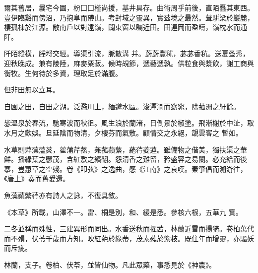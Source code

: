 \begin{pinyinscope}
爾其舊居，曩宅今園，枌囗囗槿尚援，基井具存。曲術周乎前後，直陌矗其東西。豈伊臨谿而傍沼，乃抱阜而帶山。考封域之靈異，實茲境之最然。葺駢梁於巖麓，棲孤棟於江源。敞南戶以對遠嶺，闢東窗以矚近田。田連岡而盈疇，嶺枕水而通阡。


阡陌縱橫，塍埒交經。導渠引流，脈散溝
 并。蔚蔚豐秫，苾苾香秔。送夏蚤秀，迎秋晚成。兼有陵陸，麻麥粟菽。候時覘節，遞藝遞孰。供粒食與漿飲，謝工商與衡牧。生何待於多資，理取足於滿腹。



 但非田無以立耳。



 自園之田，自田之湖。泛濫川上，緬邈水區。浚潭澗而窈窕，除菰洲之紆餘。


毖溫泉於春流，馳寒波而秋徂。風生浪於蘭渚，日倒景於椒塗。飛漸榭於中沚，取水月之歡娛。旦延陰而物清，夕棲芬而氣敷。顧情交之永絕，覬雲客之
 暫如。


水草則萍藻蕰菼，雚蒲芹蓀，蒹菰蘋蘩，蕝荇菱蓮。雖備物之偕美，獨扶渠之華鮮。播綠葉之鬱茂，含紅敷之繽翻。怨清香之難留，矜盛容之易闌。必充給而後搴，豈蕙草之空殘。卷《叩弦》之逸曲，感《江南》之哀嘆。秦箏倡而溯游往，《唐上》奏而舊愛還。



 魚藻蘋繁荇亦有詩人之詠，不復具敘。



 《本草》所載，山澤不一。雷、桐是別，和、緩是悉。參核六根，五華九
 實。


二冬並稱而殊性，三建異形而同出。水香送秋而擢茜，林蘭近雪而揚猗。卷柏萬代而不殞，伏苓千歲而方知。映紅葩於綠蒂，茂素蕤於紫枝。既住年而增靈，亦驅妖而斥疵。



 林蘭，支子。卷柏、伏苓，並皆仙物。凡此眾藥，事悉見於《神農》。



\end{pinyinscope}
